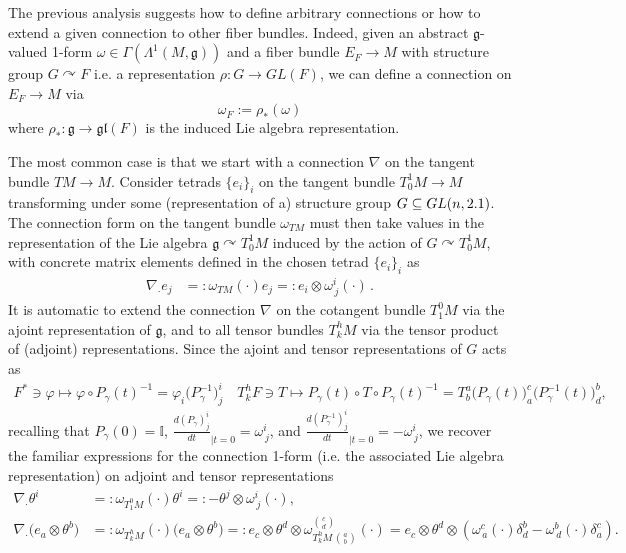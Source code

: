 \begin{mytheorem}
The previous analysis suggests how to define arbitrary connections or how to extend a given connection to other fiber bundles.
Indeed, given an abstract $\mathfrak{g}$-valued 1-form $\omega\in \Gamma\left(\Lambda^1(M,\mathfrak{g})\right)$ and a fiber bundle $E_F\to M$ with structure group $G\curvearrowright F$ i.e. a representation $\rho: G \to GL(F)$, we can define a connection on $E_F\to M$ via
\begin{equation}
    \omega_F := \rho_*(\omega)
\end{equation}
where $\rho_*: \mathfrak{g} \to \mathfrak{gl}(F)$ is the induced Lie algebra representation.

The most common case is that we start with a connection $\nabla$ on the tangent bundle $TM\to M$.
Consider tetrads $\{e_i\}_i$ on the tangent bundle $T^1_0M\to M$ transforming under some (representation of a) structure group $G\subseteq GL(n,2.1)$.
The connection form on the tangent bundle $\omega_{TM}$ must then take values in the representation of the Lie algebra $\mathfrak{g}\curvearrowright T^1_0M$ induced by the action of $G \curvearrowright T^1_0M$, with concrete matrix elements defined in the chosen tetrad $\{e_i\}_i$ as
\begin{align}
    \nabla_\cdot e_j &=: \omega_{TM}(\cdot) e_j =: e_i \otimes \omega^i_{\, j}(\cdot)\,.
\end{align}
It is automatic to extend the connection $\nabla$ on the cotangent bundle $T^0_1M$ via the ajoint representation of $\mathfrak{g}$, and to all tensor bundles $T^h_k M$ via the tensor product of (adjoint) representations.
Since the ajoint and tensor representations of $G$ acts as
\begin{align}
    F^*\ni \varphi \mapsto \varphi\circ P_\gamma(t)^{-1}= \varphi_i\big(P_\gamma^{-1}\big)^i_j\quad  T^h_k F \ni T \mapsto P_\gamma(t) \circ T \circ P_\gamma(t)^{-1} = T^a_b \big(P_\gamma(t)\big)^c_a \big(P_\gamma^{-1}(t)\big)^b_d,
\end{align}
recalling that $P_\gamma(0)=\mathbb{I}$, $\frac{d(P_\gamma)^i_j}{dt}_{\mid t=0} = \omega^i_{\, j}$, and $\frac{d(P_\gamma^{-1})^i_j}{dt}_{\mid t=0} = - \omega^i_{\, j}$, we recover the familiar expressions for the connection 1-form (i.e. the associated Lie algebra representation) on adjoint and tensor representations
\begin{align}
    \nabla_\cdot \theta^i &=: \omega_{T^0_1M}(\cdot) \theta^i=: -\theta^j \otimes \omega^i_{\, j}(\cdot),\\
    \nabla_\cdot \big(e_a\otimes \theta^b\big) &=: \omega_{T^h_k M}(\cdot) \big(e_a\otimes \theta^b\big) =: e_c \otimes \theta^d \otimes \omega^{\binom{c}{d}}_{T^h_k M\, \binom{a}{b}}(\cdot) = e_c \otimes \theta^d \otimes \left( \omega^c_{\, a}(\cdot) \delta^b_d -\omega^b_{\, d}(\cdot) \delta^c_a\right).
\end{align}


\end{mytheorem}
